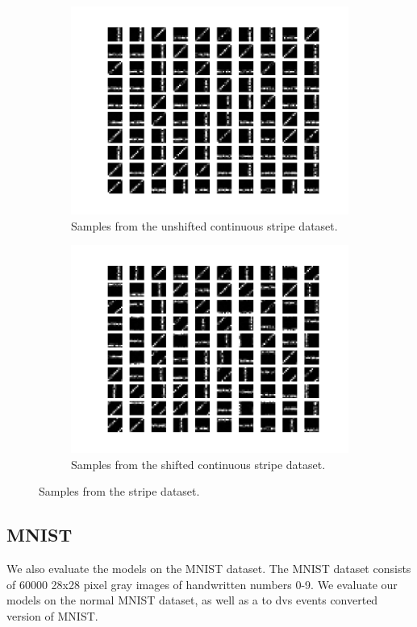 \begin{figure}[h!]
\begin{subfigure}[t]{.49\textwidth}
  		\includegraphics[width=.9\linewidth]{imgs/stripes3.png}
  		\caption{Samples from the unshifted continuous stripe dataset.}
  		\label{fig:sub2}
	\end{subfigure}
	\begin{subfigure}[t]{.49\textwidth}
  		\centering
  		\includegraphics[width=.9\linewidth]{imgs/stripes4.png}
  		\caption{Samples from the shifted continuous stripe dataset.}
  		\label{fig:sub2}
	\end{subfigure}
	\caption{Samples from the stripe dataset. }
	\label{fig:stripes}
\end{figure}


\subsection{MNIST}

We also evaluate the models on the MNIST dataset. 
The MNIST dataset consists of 60000 28x28 pixel gray images of handwritten numbers 0-9.
We evaluate our models on the normal MNIST dataset, as well as a to dvs events converted version of MNIST.

